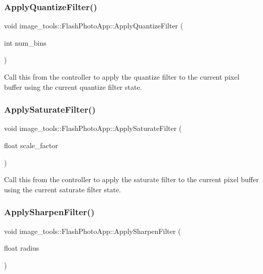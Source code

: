\subsubsection{\texorpdfstring{Apply\+Quantize\+Filter()}{ApplyQuantizeFilter()}}
{\footnotesize\ttfamily void image\+\_\+tools\+::\+Flash\+Photo\+App\+::\+Apply\+Quantize\+Filter (\begin{DoxyParamCaption}\item[{int}]{num\+\_\+bins }\end{DoxyParamCaption})}

Call this from the controller to apply the quantize filter to the current pixel buffer using the current quantize filter state. \mbox{\label{classimage__tools_1_1FlashPhotoApp_ae9be418a3b05fe8bf16dacc95708fb28}} 
\subsubsection{\texorpdfstring{Apply\+Saturate\+Filter()}{ApplySaturateFilter()}}
{\footnotesize\ttfamily void image\+\_\+tools\+::\+Flash\+Photo\+App\+::\+Apply\+Saturate\+Filter (\begin{DoxyParamCaption}\item[{float}]{scale\+\_\+factor }\end{DoxyParamCaption})}

Call this from the controller to apply the saturate filter to the current pixel buffer using the current saturate filter state. \mbox{\label{classimage__tools_1_1FlashPhotoApp_a417e86946b777c42db91eab906d26354}} 
\subsubsection{\texorpdfstring{Apply\+Sharpen\+Filter()}{ApplySharpenFilter()}}
{\footnotesize\ttfamily void image\+\_\+tools\+::\+Flash\+Photo\+App\+::\+Apply\+Sharpen\+Filter (\begin{DoxyParamCaption}\item[{float}]{radius }\end{DoxyParamCaption})}

